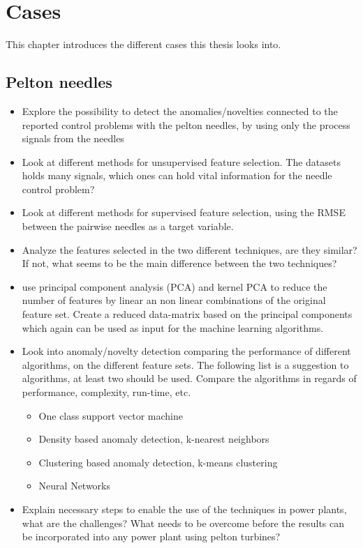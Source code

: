 \chapter{Cases}\label{cha:cases}
This chapter introduces the different cases this thesis looks into. 

\section{Pelton needles}\label{sub:pelton_needles}

    \begin{itemize}
        \item Explore the possibility to detect the anomalies/novelties connected to the reported control problems with the pelton needles, by using only the process signals from the needles  
        \item Look at different methods for unsupervised feature selection. The datasets holds many signals, which ones can hold vital information for the needle control problem? 
        \item Look at different methods for supervised feature selection, using the RMSE between the pairwise needles as a target variable. 
        \item Analyze the features selected in the two different techniques, are they similar? If not, what seems to be the main difference between the two techniques? 
        \item use principal component analysis (PCA) and kernel PCA to reduce the number of features by linear an non linear combinations of the original feature set. Create a reduced data-matrix based on the principal components which again can be used as input for the machine learning algorithms. 
        \item Look into anomaly/novelty detection comparing the performance of different algorithms, on the different feature sets. The following list is a suggestion to algorithms, at least two should be used. Compare the algorithms in regards of performance, complexity, run-time, etc. 
        \begin{itemize}
            \item One class support vector machine
            \item Density based anomaly detection, k-nearest neighbors
            \item Clustering based anomaly detection, k-means clustering 
            \item Neural Networks 
        \end{itemize}
        \item Explain necessary steps to enable the use of the techniques in power plants, what are the challenges? What needs to be overcome before the results can be incorporated into any power plant using pelton turbines?     
        
    \end{itemize}
    
